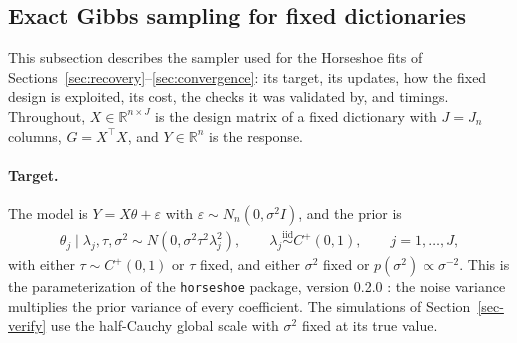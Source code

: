 \subsection*{Exact Gibbs sampling for fixed dictionaries}

This subsection describes the sampler used for the Horseshoe fits of Sections~\ref{sec:recovery}--\ref{sec:convergence}: its target, its updates, how the fixed design is exploited, its cost, the checks it was validated by, and timings. Throughout, $X\in\mathbb{R}^{n\times J}$ is the design matrix of a fixed dictionary with $J=J_n$ columns, $G=X^\top X$, and $Y\in\mathbb{R}^n$ is the response.

\paragraph*{Target.} The model is $Y=X\theta+\varepsilon$ with $\varepsilon\sim N_n(0,\sigma^2I)$, and the prior is
\begin{align*}
\theta_j\mid\lambda_j,\tau,\sigma^2\sim N(0,\sigma^2\tau^2\lambda_j^2),\qquad \lambda_j\overset{\mathrm{iid}}{\sim}C^+(0,1),\qquad j=1,\ldots,J,
\end{align*}
with either $\tau\sim C^+(0,1)$ or $\tau$ fixed, and either $\sigma^2$ fixed or $p(\sigma^2)\propto\sigma^{-2}$. This is the parameterization of the \texttt{horseshoe} package, version 0.2.0 \citep{HorseshoeR}: the noise variance multiplies the prior variance of every coefficient. The simulations of Section~\ref{sec-verify} use the half-Cauchy global scale with $\sigma^2$ fixed at its true value.

